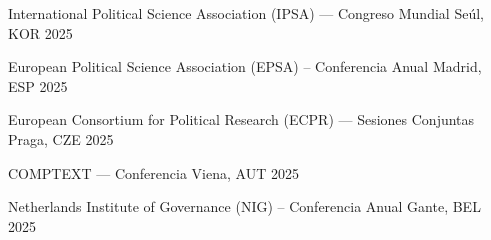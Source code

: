 





\hspace{2.25mm}{\footnotesize $^\star$ Selección de solo los últimos cinco años}

\vspace{1mm}

\begin{cvhonors}
\cvconf
{International Political Science Association (IPSA) --- Congreso Mundial} 
{Seúl, KOR}
{2025}
\end{cvhonors}

\begin{cvhonors}
\cvconf
{European Political Science Association (EPSA) -- Conferencia Anual}
{Madrid, ESP}
{2025}
\end{cvhonors}

\begin{cvhonors}
\cvconf
{European Consortium for Political Research (ECPR) --- Sesiones Conjuntas} 
{Praga, CZE}
{2025}
\end{cvhonors}

\begin{cvhonors}
\cvconf
{COMPTEXT --- Conferencia} 
{Viena, AUT}
{2025}
\end{cvhonors}

\begin{cvhonors}
\cvconf
{Netherlands Institute of Governance (NIG) -- Conferencia Anual} 
{Gante, BEL}
{2025}
\end{cvhonors}

